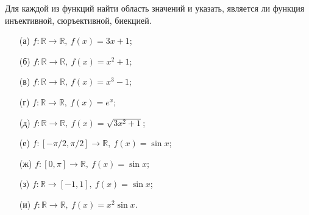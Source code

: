 \documentclass{article}
\begin{document}
\begin{task}[2]
Для каждой из функций найти область значений и указать, является ли функция инъективной, сюръективной, биекцией.
\begin{enumerate}
    \item[(а)] $f : \mathbb{R} \to \mathbb{R},\ f(x) = 3x + 1$;
    \item[(б)] $f : \mathbb{R} \to \mathbb{R},\ f(x) = x^2 + 1$;
    \item[(в)] $f : \mathbb{R} \to \mathbb{R},\ f(x) = x^3 - 1$;
    \item[(г)] $f : \mathbb{R} \to \mathbb{R},\ f(x) = e^x$;
    \item[(д)] $f : \mathbb{R} \to \mathbb{R},\ f(x) = \sqrt{3x^2 + 1}$;
    \item[(е)] $f : [-\pi/2, \pi/2] \to \mathbb{R},\ f(x) = \sin x$;
    \item[(ж)] $f : [0, \pi] \to \mathbb{R},\ f(x) = \sin x$;
    \item[(з)] $f : \mathbb{R} \to [-1, 1],\ f(x) = \sin x$;
    \item[(и)] $f : \mathbb{R} \to \mathbb{R},\ f(x) = x^2 \sin x$.
\end{enumerate}
\end{task}
\end{document}
